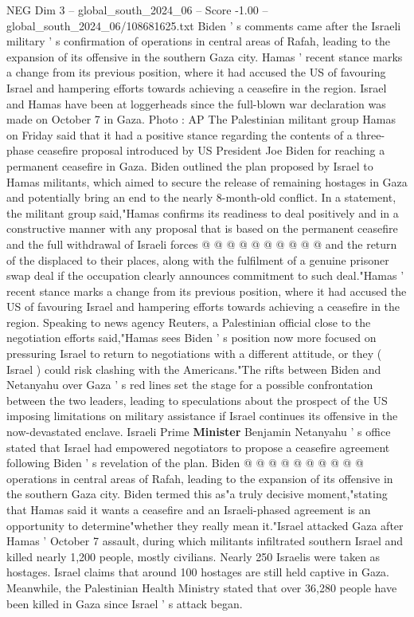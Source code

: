 \begin{textsample}{NEG Dim 3 – global\_south\_2024\_06 – Score -1.00 – global\_south\_2024\_06/108681625.txt}  \label{ex:f3_neg_116}
Biden ' s comments came after the Israeli military ' s confirmation of operations in central areas of Rafah, leading to the expansion of its offensive in the southern Gaza city.
Hamas ' recent stance marks a change from its previous position, where it had accused the US of favouring Israel and hampering efforts towards achieving a ceasefire in the region.
Israel and Hamas have been at loggerheads since the full-blown war declaration was made on October 7 in Gaza.
Photo : AP The Palestinian militant group Hamas on Friday said that it had a positive stance regarding the contents of a three-phase ceasefire proposal introduced by US President Joe Biden for reaching a permanent ceasefire in Gaza.
Biden outlined the plan proposed by Israel to Hamas militants, which aimed to secure the release of remaining hostages in Gaza and potentially bring an end to the nearly 8-month-old conflict.
In a statement, the militant group said,"Hamas confirms its readiness to deal positively and in a constructive manner with any proposal that is based on the permanent ceasefire and the full withdrawal of Israeli forces @ @ @ @ @ @ @ @ @ @ and the return of the displaced to their places, along with the fulfilment of a genuine prisoner swap deal if the occupation clearly announces commitment to such deal."Hamas ' recent stance marks a change from its previous position, where it had accused the US of favouring Israel and hampering efforts towards achieving a ceasefire in the region.
Speaking to news agency Reuters, a Palestinian official close to the negotiation efforts said,"Hamas sees Biden ' s position now more focused on pressuring Israel to return to negotiations with a different attitude, or they ( Israel ) could risk clashing with the Americans."The rifts between Biden and Netanyahu over Gaza ' s red lines set the stage for a possible confrontation between the two leaders, leading to speculations about the prospect of the US imposing limitations on military assistance if Israel continues its offensive in the now-devastated enclave.
Israeli Prime \textbf{Minister} Benjamin Netanyahu ' s office stated that Israel had empowered negotiators to propose a ceasefire agreement following Biden ' s revelation of the plan.
Biden @ @ @ @ @ @ @ @ @ @ operations in central areas of Rafah, leading to the expansion of its offensive in the southern Gaza city.
Biden termed this as"a truly decisive moment,"stating that Hamas said it wants a ceasefire and an Israeli-phased agreement is an opportunity to determine"whether they really mean it."Israel attacked Gaza after Hamas ' October 7 assault, during which militants infiltrated southern Israel and killed nearly 1,200 people, mostly civilians.
Nearly 250 Israelis were taken as hostages.
Israel claims that around 100 hostages are still held captive in Gaza.
Meanwhile, the Palestinian Health Ministry stated that over 36,280 people have been killed in Gaza since Israel ' s attack began.

\end{textsample}
